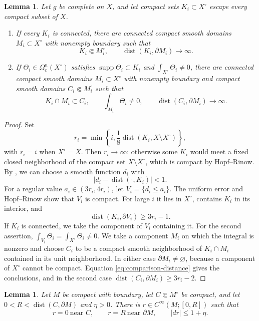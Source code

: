 \documentclass[12pt,reqno]{amsart}
\numberwithin{equation}{section}
\newtheorem{lemma}[theorem]{Lemma}
\theoremstyle{definition}
\newcommand{\supp}{\operatorname{supp}}
\newcommand{\dist}{\operatorname{dist}}
\begin{document}
\begin{lemma}\label{lem:comparison-domains}
Let $g$ be complete on $X$, and let compact sets
$K_i\subset X^\circ$ escape every compact subset of $X$.
\begin{enumerate}[label=\textup{(\roman*)}]
\item If every $K_i$ is connected, there are connected compact smooth
domains $M_i\subset X^\circ$ with nonempty boundary such that
\[
 K_i\Subset M_i^\circ,
 \qquad \dist(K_i,\partial M_i)\longrightarrow\infty.
\]

\item If $\Theta_i\in\Omega_c^n(X^\circ)$ satisfies
$\supp\Theta_i\subset K_i$ and $\int_{X^\circ}\Theta_i\ne0$, there
are connected compact smooth domains $M_i\subset X^\circ$ with
nonempty boundary and compact smooth domains
$C_i\Subset M_i^\circ$ such that
\[
 K_i\cap M_i\subset C_i,
 \qquad \int_{M_i}\Theta_i\ne0,
 \qquad \dist(C_i,\partial M_i)\longrightarrow\infty.
\]
\end{enumerate}
\end{lemma}

\begin{proof}
Set
\[
 r_i=\min\!\left\{i,
       \frac18\dist(K_i,X\setminus X^\circ)\right\},
\]
with $r_i=i$ when $X^\circ=X$.  Then $r_i\to\infty$: otherwise some
$K_i$ would meet a fixed closed neighborhood of the compact set
$X\setminus X^\circ$, which is compact by Hopf--Rinow.  By
\cite[Theorem~1]{AzagraSmooth}, we can choose a smooth function $d_i$ with
\[
 |d_i-\dist(\mathord\cdot,K_i)|<1.
\]
For a regular value $a_i\in(3r_i,4r_i)$, let
$V_i=\{d_i\leq a_i\}$.  The uniform error and Hopf--Rinow show that
$V_i$ is compact. For large $i$ it lies in $X^\circ$, contains $K_i$
in its interior, and
\begin{equation}\label{eq:comparison-distance}
 \dist(K_i,\partial V_i)\geq3r_i-1.
\end{equation}
If $K_i$ is connected, we take the component of $V_i$ containing it.
For the second assertion,
$\int_{V_i}\Theta_i=\int_{X^\circ}\Theta_i\ne0$. We take a component
$M_i$ on which the integral is nonzero and choose $C_i$ to be a
compact smooth neighborhood of $K_i\cap M_i$ contained in its unit
neighborhood.  In either case $\partial M_i\ne\varnothing$, because a
component of $X^\circ$ cannot be compact.  Equation
\eqref{eq:comparison-distance} gives the conclusions, and in the
second case
$\dist(C_i,\partial M_i)\geq3r_i-2$.
\end{proof}

\begin{lemma}\label{lem:smooth-plateau}
Let $M$ be compact with boundary, let $C\Subset M^\circ$ be compact,
and let $0<R<\dist(C,\partial M)$ and $\eta>0$.  There is
$r\in C^\infty(M;[0,R])$ such that
\[
 r=0\ \text{near }C,
 \qquad r=R\ \text{near }\partial M,
 \qquad |dr|\leq1+\eta.
\]
\end{lemma}
\end{document}
